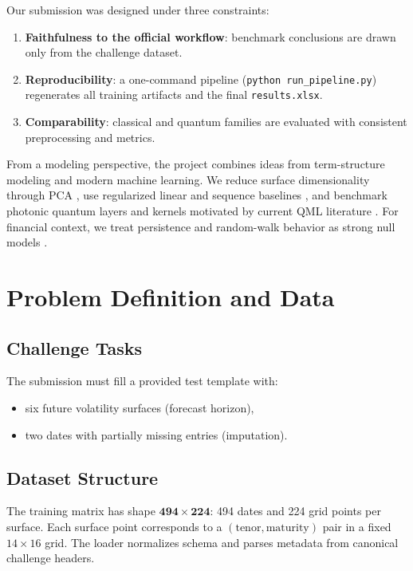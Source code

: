 \documentclass[11pt]{article}
\begin{document}
Our submission was designed under three constraints:
\begin{enumerate}[leftmargin=1.4em]
  \item \textbf{Faithfulness to the official workflow}: benchmark conclusions are drawn only from the challenge dataset.
  \item \textbf{Reproducibility}: a one-command pipeline (\texttt{python run\_pipeline.py}) regenerates all training artifacts and the final \texttt{results.xlsx}.
  \item \textbf{Comparability}: classical and quantum families are evaluated with consistent preprocessing and metrics.
\end{enumerate}

From a modeling perspective, the project combines ideas from term-structure modeling and modern machine learning. We reduce surface dimensionality through PCA \cite{jolliffe2002pca}, use regularized linear and sequence baselines \cite{hoerl1970ridge,hochreiter1997lstm,chen2016xgboost}, and benchmark photonic quantum layers and kernels motivated by current QML literature \cite{havlicek2019supervised,schuld2019feature,schuld2021kernel,cerezo2021vqa}. For financial context, we treat persistence and random-walk behavior as strong null models \cite{fama1970efficient,diebold2006yield,brace1997market}.

\section{Problem Definition and Data}
\subsection{Challenge Tasks}
The submission must fill a provided test template with:
\begin{itemize}[leftmargin=1.4em]
  \item six future volatility surfaces (forecast horizon),
  \item two dates with partially missing entries (imputation).
\end{itemize}

\subsection{Dataset Structure}
The training matrix has shape \(\mathbf{494 \times 224}\): 494 dates and 224 grid points per surface. Each surface point corresponds to a \((\text{tenor}, \text{maturity})\) pair in a fixed \(14 \times 16\) grid. The loader normalizes schema and parses metadata from canonical challenge headers.
\end{document}
